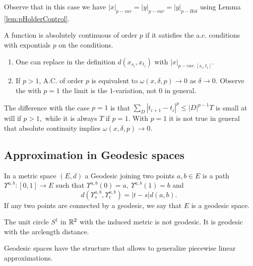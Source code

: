 Observe that in this case we have $|x|_{p-var} = |y|_{p-var} = |y|_{p-Hol}$ using Lemma \ref{lem:pHolderControl}.

\begin{exercise}
    A function is absolutely continuous of order $p$ if it satisfies the a.c. conditions with expontials $p$ on the conditions.
    \begin{enumerate}
        \item One can replace in the definition $d(x_{s_i}, x_{t_i})$ with $|x|_{p-var,[s_i,t_i]}$.
        \item If $p > 1$, A.C. of order $p$ is equivalent to $\omega(x,\delta,p) \rightarrow 0$ as $\delta \rightarrow 0.$ Observe the with $p=1$ the limit is the $1$-variation, not $0$ in general.
    \end{enumerate}
\end{exercise}
\begin{observation}
    The difference with the case $p=1$ is that $\sum_D |t_{i+1} - t_i|^p \leq |D|^{p-1} T$ is small at will if $p > 1,$ while it is always $T$ if $p=1.$
    With $p=1$ it is not true in general that absolute continuity implies $\omega(x,\delta,p) \rightarrow 0$.
\end{observation}

\subsection{Approximation in Geodesic spaces}

\begin{definition}
    In a metric space $(E,d)$ a Geodesic joining two points $a,b \in E$ is a path $\Upsilon^{a,b}:[0,1] \rightarrow E$ such that $\Upsilon^{a,b}(0) = a,\ \Upsilon^{a,b}(1) = b$ and 
    \begin{equation}
        d \left( \Upsilon^{a,b}_s, \Upsilon^{a,b}_t \right) = |t - s| d(a,b).
    \end{equation} 
    If any two points are connected by a geodesic, we say that $E$ is a geodesic space.
\end{definition}

\begin{example}
    The unit circle $S^1$ in $\mathbb{R}^2$ with the induced metric is not geodesic. It is geodesic with the arclength distance.
\end{example}

Geodesic spaces have the structure that allows to generalize piecewise linear approximations.


